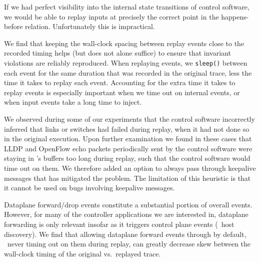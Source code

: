  If we had perfect visibility into
the internal state transitions of control software, we would be able to replay inputs at precisely the correct point in
the happens-before relation. Unfortunately this is impractical.

We find that keeping the wall-clock spacing between replay events
close to the recorded timing helps (but does not alone suffice) to
ensure that invariant violations are reliably
reproduced. When replaying events, we \verb=sleep()= between each
event for the same duration that was recorded in the original trace,
less the time it takes to replay each event. Accounting for the
extra time it takes to replay events is especially important when we
time out on internal events, or when input events take a long time to inject.

 We observed during some
of our experiments that the control software incorrectly inferred that links or switches had
failed during replay, when it had not done so in the original execution.
Upon further examination we found in these cases that LLDP and OpenFlow echo
packets periodically sent by the control software were
staying in \projectname's buffers too long during replay, such that the
control software would time out on them. We therefore added an option to always pass through
keepalive messages that has mitigated the problem. The limitation of this
heuristic is that it cannot be used on bugs involving keepalive messages.


 Dataplane forward/drop events constitute a
substantial portion of overall events. However, for
many of the controller applications we are interested in, dataplane
forwarding is only relevant insofar as it triggers control plane events
(\eg~host discovery). We find that allowing dataplane forward events through by
default, \ie~never timing out on them during replay, can greatly decrease
skew between the wall-clock timing of the original vs.\ replayed trace.


